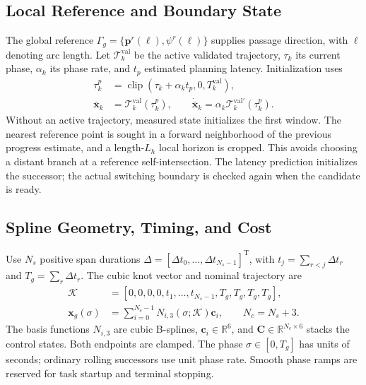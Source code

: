\documentclass[journal,twoside]{IEEEtran}
\newcommand{\clip}{\operatorname{clip}}
\begin{document}
\subsection{Local Reference and Boundary State}
The global reference $\Gamma_g=\{\mathbf p^r(\ell),\psi^r(\ell)\}$ supplies passage direction, with $\ell$ denoting arc length. Let $\mathcal T_k^{\mathrm{val}}$ be the active validated trajectory, $\tau_k$ its current phase, $\alpha_k$ its phase rate, and $t_p$ estimated planning latency. Initialization uses
\begin{equation}
\begin{aligned}
\tau_k^p&=\clip(\tau_k+\alpha_kt_p,0,T_k^{\mathrm{val}}),\\
\bar{\mathbf x}_k&=\mathcal T_k^{\mathrm{val}}(\tau_k^p),\qquad
\dot{\bar{\mathbf x}}_k=\alpha_k\mathcal T_k^{\mathrm{val}\prime}(\tau_k^p).
\end{aligned}
\label{eq:prediction}
\end{equation}
Without an active trajectory, measured state initializes the first window. The nearest reference point is sought in a forward neighborhood of the previous progress estimate, and a length-$L_h$ local horizon is cropped. This avoids choosing a distant branch at a reference self-intersection. The latency prediction initializes the successor; the actual switching boundary is checked again when the candidate is ready.

\subsection{Spline Geometry, Timing, and Cost}
Use $N_s$ positive span durations $\Delta=[\Delta t_0,\ldots,\Delta t_{N_s-1}]^{\mathrm T}$, with $t_j=\sum_{r<j}\Delta t_r$ and $T_g=\sum_r\Delta t_r$. The cubic knot vector and nominal trajectory are
\begin{equation}
\begin{aligned}
\mathcal K&=[0,0,0,0,t_1,\ldots,t_{N_s-1},T_g,T_g,T_g,T_g],\\
\mathbf x_g(\sigma)&=\sum_{i=0}^{N_c-1}N_{i,3}(\sigma;\mathcal K)\mathbf c_i,
\qquad N_c=N_s+3.
\end{aligned}
\label{eq:spline}
\end{equation}
The basis functions $N_{i,3}$ are cubic B-splines, $\mathbf c_i\in\mathbb R^6$, and $\mathbf C\in\mathbb R^{N_c\times6}$ stacks the control states. Both endpoints are clamped. The phase $\sigma\in[0,T_g]$ has units of seconds; ordinary rolling successors use unit phase rate. Smooth phase ramps are reserved for task startup and terminal stopping.
\end{document}
